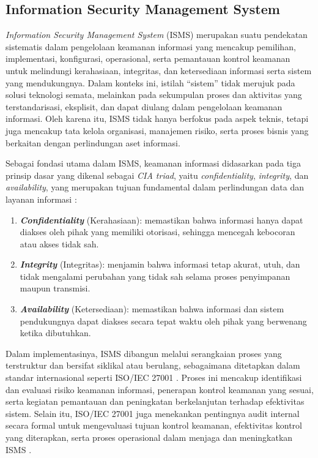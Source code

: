 \subsection{Information Security Management System}

\textit{Information Security Management System} (ISMS) merupakan suatu pendekatan sistematis dalam pengelolaan keamanan informasi yang mencakup pemilihan, implementasi, konfigurasi, operasional, serta pemantauan kontrol keamanan untuk melindungi kerahasiaan, integritas, dan ketersediaan informasi serta sistem yang mendukungnya. Dalam konteks ini, istilah ``sistem'' tidak merujuk pada solusi teknologi semata, melainkan pada sekumpulan proses dan aktivitas yang terstandarisasi, eksplisit, dan dapat diulang dalam pengelolaan keamanan informasi. Oleh karena itu, ISMS tidak hanya berfokus pada aspek teknis, tetapi juga mencakup tata kelola organisasi, manajemen risiko, serta proses bisnis yang berkaitan dengan perlindungan aset informasi.

Sebagai fondasi utama dalam ISMS, keamanan informasi didasarkan pada tiga prinsip dasar yang dikenal sebagai \textit{CIA triad}, yaitu \textit{confidentiality}, \textit{integrity}, dan \textit{availability}, yang merupakan tujuan fundamental dalam perlindungan data dan layanan informasi \cite{stallings2017security,otero2019itcontrol}:

\begin{enumerate}
	\item \textbf{\textit{Confidentiality}} (Kerahasiaan): memastikan bahwa informasi hanya dapat diakses oleh pihak yang memiliki otorisasi, sehingga mencegah kebocoran atau akses tidak sah.
	\item \textbf{\textit{Integrity}} (Integritas): menjamin bahwa informasi tetap akurat, utuh, dan tidak mengalami perubahan yang tidak sah selama proses penyimpanan maupun transmisi.
	\item \textbf{\textit{Availability}} (Ketersediaan): memastikan bahwa informasi dan sistem pendukungnya dapat diakses secara tepat waktu oleh pihak yang berwenang ketika dibutuhkan.
\end{enumerate}

Dalam implementasinya, ISMS dibangun melalui serangkaian proses yang terstruktur dan bersifat siklikal atau berulang, sebagaimana ditetapkan dalam standar internasional seperti ISO/IEC 27001 \cite{otero2019itcontrol}. Proses ini mencakup identifikasi dan evaluasi risiko keamanan informasi, penerapan kontrol keamanan yang sesuai, serta kegiatan pemantauan dan peningkatan berkelanjutan terhadap efektivitas sistem. Selain itu, ISO/IEC 27001 juga menekankan pentingnya audit internal secara formal untuk mengevaluasi tujuan kontrol keamanan, efektivitas kontrol yang diterapkan, serta proses operasional dalam menjaga dan meningkatkan ISMS \cite{gantz2014itaudit}.

